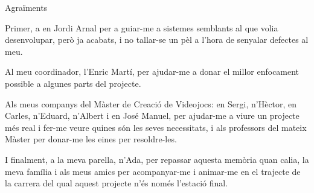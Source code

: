 \newpage

{\LARGE Agraïments}


Primer, a en Jordi Arnal per a guiar-me a sistemes semblants al que volia desenvolupar, però ja acabats, i no tallar-se un pèl a l'hora de senyalar defectes al meu.

Al meu coordinador, l'Enric Martí, per ajudar-me a donar el millor enfocament possible a algunes parts del projecte.

Als meus companys del Màster de Creació de Videojocs: en Sergi, n'Hèctor, en Carles, n'Eduard, n'Albert i en José Manuel, per ajudar-me a viure un projecte més real i fer-me veure quines són les seves necessitats, i als professors del mateix Màster per donar-me les eines per resoldre-les.

I finalment, a la meva parella, n'Ada, per repassar aquesta memòria quan calia, la meva família i als meus amics per acompanyar-me i animar-me en el trajecte de la carrera del qual aquest projecte n'és només l'estació final.